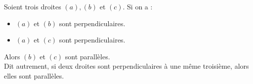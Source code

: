 {Soient trois droites $(a), (b)$ et $(c)$.
Si on a :\vspace{1em}\\
\begin{minipage}{0.65\textwidth}
    \begin{itemize}
        \item $(a)$ et $(b)$ sont perpendiculaires.
        \item $(a)$ et $(c)$ sont perpendiculaires.
    \end{itemize}
        Alors $(b)$ et $(c)$ sont parallèles.\vspace{1em} \\
        Dit autrement, si deux droites sont perpendiculaires à une même troisième, alors elles sont parallèles.
\end{minipage}
\hfill
\begin{minipage}{0.3\textwidth}
    \begin{figure}[H]
        \centering
    \end{figure}
\end{minipage}
}
